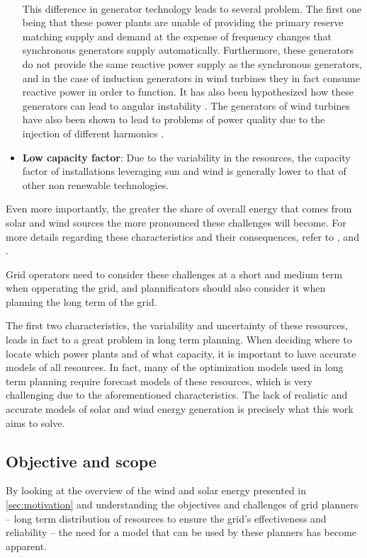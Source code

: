 \begin{itemize}
    \\This difference in generator technology leads to several problem. The first one being that these power plants are unable of providing the primary reserve matching supply and demand at the expense of frequency changes that synchronous generators supply automatically. Furthermore, these generators do not provide the same reactive power supply as the synchronous generators, and in the case of induction generators in wind turbines they in fact consume reactive power in order to function. It has also been hypothesized how these generators can lead to angular instability \cite{vittal_raja_ayyanar_2023}. The generators of wind turbines have also been shown to lead to problems of power quality due to the injection of different harmonics \cite{muljadi_butterfield_chacon_romanowitz_2006}. 
    \item \textbf{Low capacity factor}: Due to the variability in the resources, the capacity factor of installations leveraging sun and wind is generally lower to that of other non renewable technologies. 
\end{itemize}

Even more importantly, the greater the share of overall energy that comes from solar and wind sources the more pronounced these challenges will become. For more details regarding these characteristics and their consequences, refer to \cite{ahmed_fahad_2020}, \cite{kumar_pandey_sinha_2016} and \cite{steen_goop_2014}.

Grid operators need to consider these challenges at a short and medium term when opperating the grid, and plannificators should also consider it when planning the long term of the grid. 

The first two characteristics, the variability and uncertainty of these resources, leads in fact to a great problem in long term planning. When deciding where to locate which power plants and of what capacity, it is important to have accurate models of all resources. In fact, many of the optimization models used in long term planning require forecast models of these resources, which is very challenging due to the aforementioned characteristics. The lack of realistic and accurate models of solar and wind energy generation is precisely what this work aims to solve.

\subsection{Objective and scope}
\label{sec:objective-and-scope}
By looking at the overview of the wind and solar energy presented in \autoref{sec:motivation}  and understanding the objectives and challenges of grid planners -- long term distribution of resources to ensure the grid's effectiveness and reliability -- the need for a model that can be used by these planners has become apparent. 

